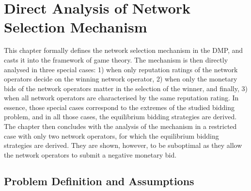 \chapter{Direct Analysis of Network Selection Mechanism} %
\label{cha:direct}

This chapter formally defines the network selection mechanism in the DMP, and casts it into the framework of game theory. The mechanism is then directly analysed in three special cases: 1) when only reputation ratings of the network operators decide on the winning network operator, 2) when only the monetary bids of the network operators matter in the selection of the winner, and finally, 3) when all network operators are characterised by the same reputation rating. In essence, those special cases correspond to the extremes of the studied bidding problem, and in all those cases, the equilibrium bidding strategies are derived. The chapter then concludes with the analysis of the mechanism in a restricted case with only two network operators, for which the equilibrium bidding strategies are derived. They are shown, however, to be suboptimal as they allow the network operators to submit a negative monetary bid.

\section{Problem Definition and Assumptions} %
\label{sec:problem_definition_and_assumptions_direct}

